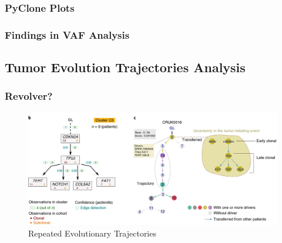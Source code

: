\documentclass{beamer}
\begin{document}
    \begin{frame}[allowframebreaks]
        \frametitle{PyClone Plots}
    \end{frame}

    \begin{frame}
        \frametitle{Findings in VAF Analysis}
    \end{frame}

    \subsection{Tumor Evolution Trajectories Analysis}
    \begin{frame}
        \frametitle{Revolver?}

        \begin{figure}
            \includegraphics[width=0.8 \linewidth]{figures/Workflow/revolver.jpg}
            \caption{Repeated Evolutionary Trajectories \protect\cite{revolver1}}
        \end{figure}
    \end{frame}
\end{document}
